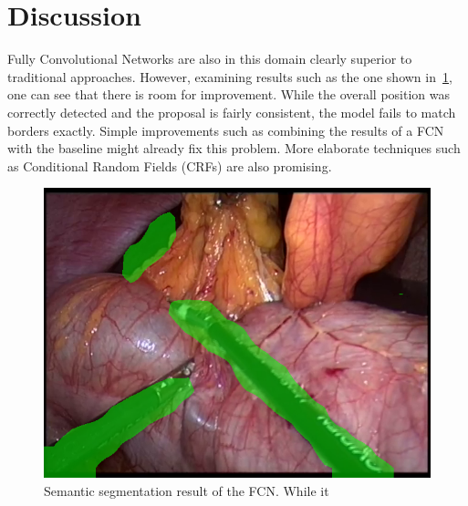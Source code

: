
\section{Discussion}\label{sec:discussion}

Fully Convolutional Networks are also in this domain clearly superior to
traditional approaches. However, examining results such as the one shown
in~\cref{fig:fcn-result}, one can see that there is room for improvement. While
the overall position was correctly detected and the proposal is fairly
consistent, the model fails to match borders exactly. Simple improvements such
as combining the results of a FCN with the baseline might already fix this
problem. More elaborate techniques such as Conditional Random Fields (CRFs) are
also promising.

\begin{figure}[ht]
    \centering
    \includegraphics[width=\linewidth]{images/7-img_07.png}
    \caption{Semantic segmentation result of the FCN. While it }
    \label{fig:fcn-result}
\end{figure}
